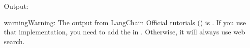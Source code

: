 \documentclass[letterpaper,11pt,english]{sphinxmanual}
\begin{document}
\sphinxAtStartPar
Output:

\begin{sphinxVerbatim}[commandchars=\\\{\}]
\end{sphinxVerbatim}

\begin{sphinxadmonition}{warning}{Warning:}
\sphinxAtStartPar
The output from LangChain Official tutorials () is
. If you use that implementation, you need to add
the  in . Otherwise, it will always
use web search.
\end{sphinxadmonition}
\end{document}
